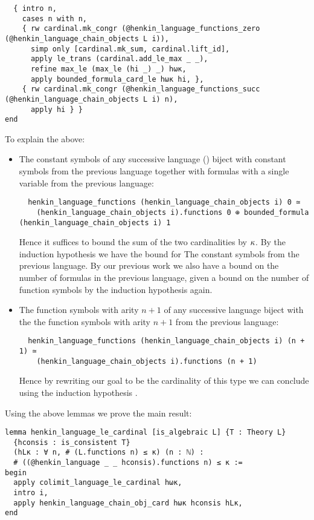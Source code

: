 \begin{lstlisting}
  { intro n,
    cases n with n,
    { rw cardinal.mk_congr (@henkin_language_functions_zero (@henkin_language_chain_objects L i)),
      simp only [cardinal.mk_sum, cardinal.lift_id],
      apply le_trans (cardinal.add_le_max _ _),
      refine max_le (max_le (hi _) _) hωκ,
      apply bounded_formula_card_le hωκ hi, },
    { rw cardinal.mk_congr (@henkin_language_functions_succ (@henkin_language_chain_objects L i) n),
      apply hi } }
end \end{lstlisting}

To explain the above:
\begin{itemize}
  \item The constant symbols of any successive language   () biject with
  constant symbols from the previous language together with
  formulas with a single variable from the previous language:
  \begin{lstlisting}
  henkin_language_functions (henkin_language_chain_objects i) 0 ≃
    (henkin_language_chain_objects i).functions 0 ⊕ bounded_formula (henkin_language_chain_objects i) 1 \end{lstlisting}
  Hence it suffices to bound the sum of the two cardinalities by $\kappa$.
  By the induction hypothesis  we have the bound for
  The constant symbols from the previous language.
  By our previous work  we also
  have a bound on the number of formulas in the previous language,
  given a bound on the number of function symbols by the induction hypothesis  again.

  \item The function symbols with arity $n + 1$ of any successive language
        biject with the the function symbols with arity $n + 1$ from the
        previous language:
\begin{lstlisting}
  henkin_language_functions (henkin_language_chain_objects i) (n + 1) ≃
    (henkin_language_chain_objects i).functions (n + 1) \end{lstlisting}
        Hence by rewriting our goal to be the cardinality of this type
        we can conclude using the induction hypothesis . \end{itemize}

Using the above lemmas we prove the main result:

\begin{lstlisting}
lemma henkin_language_le_cardinal [is_algebraic L] {T : Theory L}
  {hconsis : is_consistent T}
  (hLκ : ∀ n, # (L.functions n) ≤ κ) (n : ℕ) :
  # ((@henkin_language _ _ hconsis).functions n) ≤ κ :=
begin
  apply colimit_language_le_cardinal hωκ,
  intro i,
  apply henkin_language_chain_obj_card hωκ hconsis hLκ,
end \end{lstlisting}
